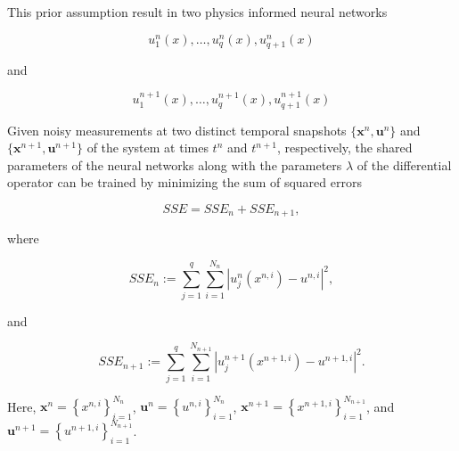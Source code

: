 \documentclass[book.tex]{subfiles}
\begin{document}
This prior assumption result in two physics informed neural networks

\begin{equation}
u^{n}_1(x), \ldots, u^{n}_q(x), u^{n}_{q+1}(x)    
\end{equation}


and

\begin{equation}
u^{n+1}_1(x), \ldots, u^{n+1}_q(x), u^{n+1}_{q+1}(x)    
\end{equation}



Given noisy measurements at two distinct temporal snapshots $\{\mathbf{x}^{n}, \mathbf{u}^{n}\}$ and $\{\mathbf{x}^{n+1}, \mathbf{u}^{n+1}\}$ of the system at times $t^{n}$ and $t^{n+1}$, respectively, the shared parameters of the neural networks along with the parameters $\lambda$ of the differential operator can be trained by minimizing the sum of squared errors

\begin{equation}
SSE = SSE_n + SSE_{n+1},    
\end{equation}



where

\begin{equation}
SSE_n := \sum_{j=1}^q \sum_{i=1}^{N_n} |u^n_j(x^{n,i}) - u^{n,i}|^2,    
\end{equation}



and

\begin{equation}
SSE_{n+1} := \sum_{j=1}^q \sum_{i=1}^{N_{n+1}} |u^{n+1}_j(x^{n+1,i}) - u^{n+1,i}|^2.    
\end{equation}



Here, $\mathbf{x}^n = \left\{x^{n,i}\right\}_{i=1}^{N_n}$, $\mathbf{u}^n = \left\{u^{n,i}\right\}_{i=1}^{N_n}$, $\mathbf{x}^{n+1} = \left\{x^{n+1,i}\right\}_{i=1}^{N_{n+1}}$, and $\mathbf{u}^{n+1} = \left\{u^{n+1,i}\right\}_{i=1}^{N_{n+1}}$.
\end{document}
